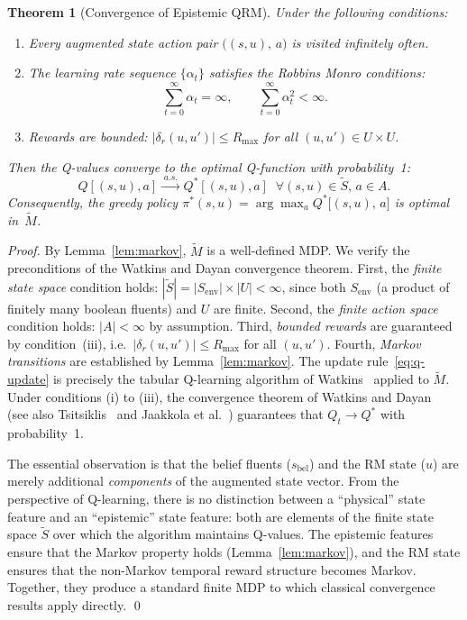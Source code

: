 \documentclass[letterpaper, 10 pt, conference]{ieeeconf}  %
\newtheorem{theorem}{Theorem}[section]
\begin{document}
\begin{theorem}[Convergence of Epistemic QRM]
\label{thm:convergence}
Under the following conditions:
\begin{enumerate}[label=(\roman*)]
    \item Every augmented state action pair $\bigl((s, u),\, a\bigr)$ is visited infinitely often.
    \item The learning rate sequence $\{\alpha_t\}$ satisfies the Robbins Monro conditions:
    \[
        \sum_{t=0}^{\infty} \alpha_t = \infty, \qquad \sum_{t=0}^{\infty} \alpha_t^2 < \infty.
    \]
    \item Rewards are bounded: $|\delta_r(u, u')| \leq R_{\max}$ for all $(u, u') \in U \times U$.
\end{enumerate}
Then the Q-values converge to the optimal Q-function with probability~1:
\[
    Q[(s,u),a] \xrightarrow{\;a.s.\;} Q^*[(s,u),a]
    \;\;\forall (s,u) \!\in\! \tilde{S},\, a \!\in\! A.
\]
Consequently, the greedy policy $\pi^*(s, u) = \arg\max_a Q^*\bigl[(s, u),\, a\bigr]$ is optimal in~$\tilde{M}$.
\end{theorem}

\begin{proof}
By Lemma~\ref{lem:markov}, $\tilde{M}$ is a well-defined MDP.  We verify the preconditions of the Watkins and Dayan convergence theorem.
First, the \emph{finite state space} condition holds: $|\tilde{S}| = |S_{\mathrm{env}}| \times |U| < \infty$, since both $S_{\mathrm{env}}$ (a product of finitely many boolean fluents) and $U$ are finite.
Second, the \emph{finite action space} condition holds: $|A| < \infty$ by assumption.
Third, \emph{bounded rewards} are guaranteed by condition~(iii), i.e.\ $|\delta_r(u,u')| \leq R_{\max}$ for all $(u, u')$.
Fourth, \emph{Markov transitions} are established by Lemma~\ref{lem:markov}.
The update rule~\eqref{eq:q-update} is precisely the tabular Q-learning algorithm of Watkins~\cite{watkins1992} applied to $\tilde{M}$.  Under conditions (i) to (iii), the convergence theorem of Watkins and Dayan~\cite{watkins1992} (see also Tsitsiklis~\cite{tsitsiklis1994} and Jaakkola et al.~\cite{jaakkola1994}) guarantees that $Q_t \to Q^*$ with probability~1.

The essential observation is that the belief fluents ($s_{\mathrm{bel}}$) and the RM state ($u$) are merely additional \emph{components} of the augmented state vector.  From the perspective of Q-learning, there is no distinction between a ``physical'' state feature and an ``epistemic'' state feature: both are elements of the finite state space $\tilde{S}$ over which the algorithm maintains Q-values.  The epistemic features ensure that the Markov property holds (Lemma~\ref{lem:markov}), and the RM state ensures that the non-Markov temporal reward structure becomes Markov.  Together, they produce a standard finite MDP to which classical convergence results apply directly. \qed
\end{proof}
\end{document}
